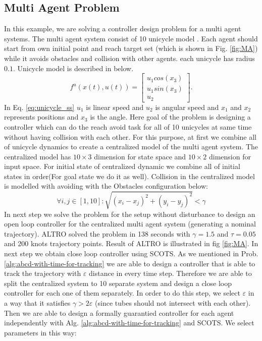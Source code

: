 \subsection{Multi Agent Problem}\label{sec:MultiAgent}
In this example, we are solving a controller design problem for a multi agent systems. The multi agent system consist of 10 unicycle model . Each agent should start from own initial point and reach target set (which is shown in Fig. \ref{fig:MA}) while it avoids obstacles and collision with other agents. each unicycle has radius $0.1$. Unicycle model is described in below.
\begin{equation}\label{eq:unicycle_ss}
	f^{u}(x(t),u(t))=
	\begin{bmatrix}
	u_1cos(x_3)\\
	u_1sin(x_3)\\
	u_2
	\end{bmatrix}.
\end{equation}
In Eq. \ref{eq:unicycle_ss} $u_1$ is linear speed and $u_2$ is  angular speed and $x_1$ and $x_2$ represents positions and $x_3$ is the angle. Here goal of the problem is designing a controller which can do the reach avoid task for all of 10 unicycles at same time without having collision with each other. For this purpose, at first we combine all of unicycle dynamics to create a centralized model of the multi agent system. The centralized model has $10\times3$ dimension for state space and $10\times2$ dimension for input space. For initial state of centralized dynamic we combine all of initial states in order(For goal state we do it as well). Collision in the centralized model is modelled with avoiding with the Obstacles configuration below:\\
\begin{equation}
\forall i,j \in [1,10]: \sqrt{(x_i-x_j)^2+(y_i-y_j)^2}< \gamma
\end{equation}
In next step we solve the problem for the setup without disturbance to design an open loop controller for the centralized multi agent system (generating a nominal trajectory). ALTRO solved the problem in 138 seconds with $\gamma=1.5$ and $\tau=0.05$ and 200 knots trajectory points. Result of ALTRO is illustrated in fig \ref{fig:MA}. 
In next step we obtain close loop controller using SCOTS. As we mentioned in Prob. \ref{alg:abcd-with-time-for-tracking} we are able to design a controller that is able to track the trajectory with $\varepsilon$ distance in every time step. Therefore we are able to split the centralized system to 10 separate system and design a close loop controller for each one of them separately. In order to do this step, we select $\varepsilon$ in a way that it satisfies $\gamma> 2\varepsilon$ (since tubes should not intersect with each other). Then we are able to design a formally guarantied controller for each agent independently with Alg. \ref{alg:abcd-with-time-for-tracking} and SCOTS. We select parameters in this way:\\
